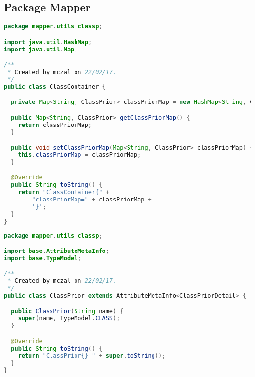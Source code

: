 \subsection{Package Mapper}

\begin{lstlisting}[language=Java,basicstyle=\tiny,caption=ClassContainer.java]
package mapper.utils.classp;

import java.util.HashMap;
import java.util.Map;

/**
 * Created by mczal on 22/02/17.
 */
public class ClassContainer {

  private Map<String, ClassPrior> classPriorMap = new HashMap<String, ClassPrior>();

  public Map<String, ClassPrior> getClassPriorMap() {
    return classPriorMap;
  }

  public void setClassPriorMap(Map<String, ClassPrior> classPriorMap) {
    this.classPriorMap = classPriorMap;
  }

  @Override
  public String toString() {
    return "ClassContainer{" +
        "classPriorMap=" + classPriorMap +
        '}';
  }
}
\end{lstlisting}


\begin{lstlisting}[language=Java,basicstyle=\tiny,caption=ClassPrior.java]
package mapper.utils.classp;

import base.AttributeMetaInfo;
import base.TypeModel;

/**
 * Created by mczal on 22/02/17.
 */
public class ClassPrior extends AttributeMetaInfo<ClassPriorDetail> {

  public ClassPrior(String name) {
    super(name, TypeModel.CLASS);
  }

  @Override
  public String toString() {
    return "ClassPrior{} " + super.toString();
  }
}
\end{lstlisting}


